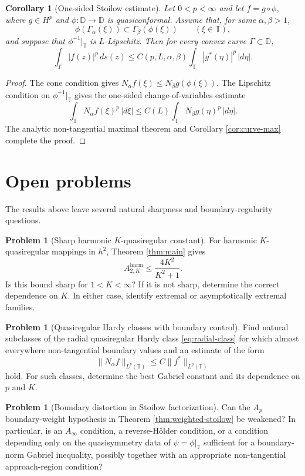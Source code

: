 \documentclass[11pt]{article}
\newtheorem{corollary}[theorem]{Corollary}
\theoremstyle{definition}
\newtheorem{problem}[theorem]{Problem}
\theoremstyle{remark}
\newcommand{\D}{\mathbb D}
\newcommand{\T}{\mathbb T}
\newcommand{\ds}{\,ds}
\begin{document}
\begin{corollary}[One-sided Stoilow estimate]\label{cor:one-sided}
Let $0<p<\infty$ and let $f=g\circ\phi$, where $g\in H^p$ and $\phi:\D\to\D$ is quasiconformal. Assume that, for some $\alpha,\beta>1$,
\[
   \phi(\Gamma_\alpha(\xi))\subset \Gamma_\beta(\phi(\xi))
   \qquad (\xi\in\T),
\]
and suppose that $\phi^{-1}|_\T$ is $L$-Lipschitz. Then for every convex curve $\Gamma\subset\D$,
\[
   \int_\Gamma |f(z)|^p\ds(z)
   \le C(p,L,\alpha,\beta)
      \int_\T |g^*(\eta)|^p\,|d\eta|.
\]
\end{corollary}

\begin{proof}
The cone condition gives $N_\alpha f(\xi)\le N_\beta g(\phi(\xi))$. The Lipschitz condition on $\phi^{-1}|_\T$ gives the one-sided change-of-variables estimate
\[
   \int_\T N_\alpha f(\xi)^p\,|d\xi|
   \le C(L)\int_\T N_\beta g(\eta)^p\,|d\eta|.
\]
The analytic non-tangential maximal theorem and Corollary \ref{cor:curve-max} complete the proof.
\end{proof}

\section{Open problems}

The results above leave several natural sharpness and boundary-regularity questions.

\begin{problem}[Sharp harmonic $K$-quasiregular constant]
For harmonic $K$-quasiregular mappings in $h^2$, Theorem \ref{thm:main} gives
\[
   A^{\mathrm{harm}}_{2,K}\le \frac{4K^2}{K^2+1}.
\]
Is this bound sharp for $1<K<\infty$? If it is not sharp, determine the correct dependence on $K$. In either case, identify extremal or asymptotically extremal families.
\end{problem}

\begin{problem}[Quasiregular Hardy classes with boundary control]
Find natural subclasses of the radial quasiregular Hardy class \eqref{eq:radial-class} for which almost everywhere non-tangential boundary values and an estimate of the form
\[
   \|N_\alpha f\|_{L^p(\T)}
   \le C\|f^*\|_{L^p(\T)}
\]
hold. For such classes, determine the best Gabriel constant and its dependence on $p$ and $K$.
\end{problem}

\begin{problem}[Boundary distortion in Stoilow factorization]
Can the $A_p$ boundary-weight hypothesis in Theorem \ref{thm:weighted-stoilow} be weakened? In particular, is an $A_\infty$ condition, a reverse-H\"older condition, or a condition depending only on the quasisymmetry data of $\psi=\phi|_\T$ sufficient for a boundary-norm Gabriel inequality, possibly together with an appropriate non-tangential approach-region condition?
\end{problem}
\end{document}
